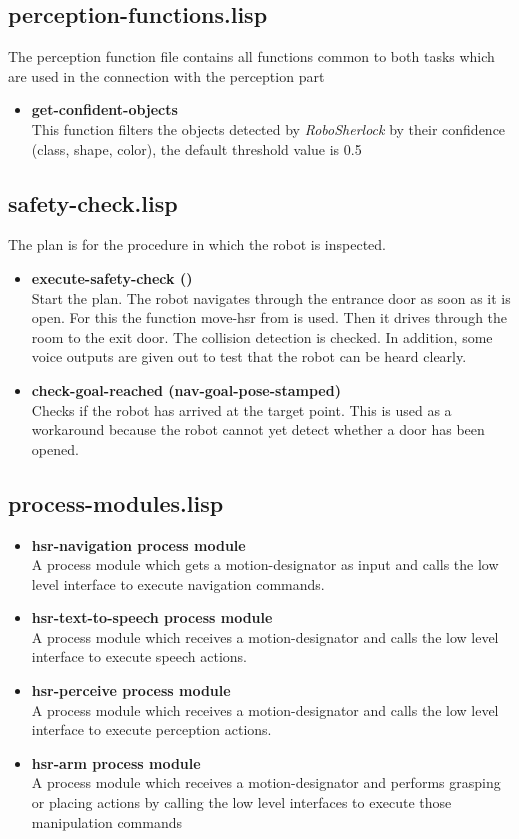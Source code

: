 \documentclass[main.tex]{subfiles}
\begin{document}
	    \subsection{perception-functions.lisp}
	    The perception function file contains all functions common to both tasks which are used in the connection with the perception part
	    \begin{itemize}
	    	\item \textbf{get-confident-objects} \\
	    	This function filters the objects detected by \textit{RoboSherlock} by their confidence (class, shape, color), the default threshold value is 0.5
	    \end{itemize}
	    \subsection{safety-check.lisp}
	    The plan is for the procedure in which the robot is inspected. 
	    \begin{itemize}
	    	\item \textbf{execute-safety-check ()} \\
	    	Start the plan. The robot navigates through the entrance door as soon as it is open. For this the function move-hsr from  is used. Then it drives through the room to the exit door. The collision detection is checked. In addition, some voice outputs are given out to test that the robot can be heard clearly.
	    	\item \textbf{check-goal-reached (nav-goal-pose-stamped)}\\
	    	Checks if the robot has arrived at the target point. This is used as a workaround because the robot cannot yet detect whether a door has been opened.
	    \end{itemize}
	    \subsection{process-modules.lisp}
	     \begin{itemize}
		\label{pcm}
	    	\item \textbf{hsr-navigation process module} \\
		A process module which gets a motion-designator as input and calls the low level interface to execute navigation commands.
		\item \textbf{hsr-text-to-speech process module} \\
		A process module which receives a motion-designator and calls the low level interface to execute speech actions.
		\item \textbf{hsr-perceive process module} \\
		A process module which receives a motion-designator and calls the low level interface to execute perception actions.
		\item\textbf{hsr-arm process module} \\
		A process module which receives a motion-designator and performs grasping or placing actions by calling the low level interfaces to execute those manipulation commands 
	    \end{itemize}
\end{document}
